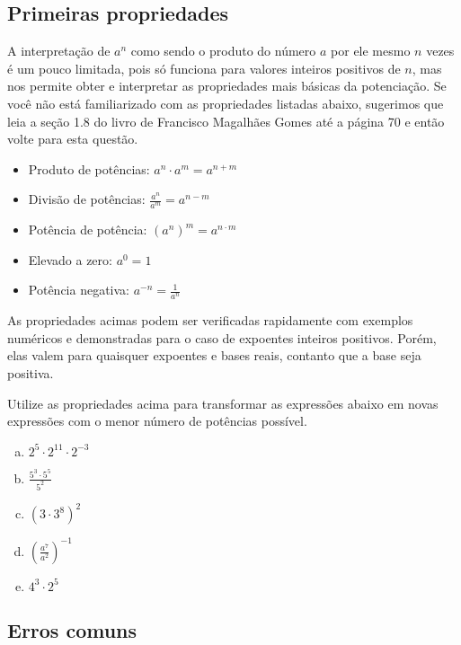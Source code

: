 \documentclass[main_estudante.tex]{subfiles}
\begin{document}
\subsection*{Primeiras propriedades}

A interpretação de $a^n$ como sendo o produto do número $a$ por ele mesmo $n$ vezes é um pouco limitada, pois só funciona para valores inteiros positivos de $n$, mas nos permite obter e interpretar as propriedades mais básicas da potenciação. Se você não está familiarizado com as propriedades listadas abaixo, sugerimos que leia a seção 1.8 do livro  de Francisco Magalhães Gomes até a página 70 e então volte para esta questão.

\begin{itemize}
 \item Produto de potências: $a^n \cdot a^m = a^{n+m}$
 \item Divisão de potências: $\frac{a^n}{a^m} = a^{n-m}$
 \item Potência de potência: $(a^n)^m = a^{n \cdot m}$
 \item Elevado a zero: $a^0 = 1$
 \item Potência negativa: $a^{-n} = \frac{1}{a^n}$
\end{itemize}

As propriedades acimas podem ser verificadas rapidamente com exemplos numéricos e demonstradas para o caso de expoentes inteiros positivos. Porém, elas valem para quaisquer expoentes e bases reais, contanto que a base seja positiva.

\begin{questao}
Utilize as propriedades acima para transformar as expressões abaixo em novas expressões com o menor número de potências possível.
\begin{enumerate}[a)]
\item $2^5 \cdot 2^{11} \cdot 2^{-3}$
\item $\frac{5^3 \cdot 5^5}{5^2}$
\item $(3 \cdot 3^8)^2$
\item $(\frac{a^7}{a^2})^{-1}$
\item $4^3 \cdot 2^5$
\end{enumerate}
\end{questao}

\subsection*{Erros comuns}
\end{document}
